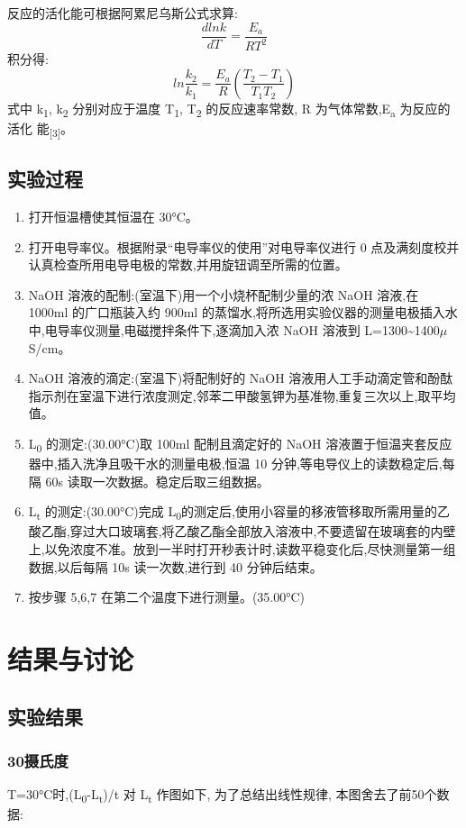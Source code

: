 \documentclass[11pt]{article}
\begin{document}
反应的活化能可根据阿累尼乌斯公式求算:
\[
\frac{dlnk}{dT}=\frac{E_{a}}{RT^{2}}
\]
积分得:
\[
ln\frac{k_{2}}{k_{1}}=\frac{E_{a}}{R}(\frac{T_{2}-T_{1}}{T_{1}T_{2}})
\]
式中 k\textsubscript{1}, k\textsubscript{2} 分别对应于温度 T\textsubscript{1}, T\textsubscript{2} 的反应速率常数,
R 为气体常数,E\textsubscript{a} 为反应的活化
能\textsubscript{[3]}。
\subsection{实验过程}
\label{sec:orgc883c78}

\begin{enumerate}
\item 打开恒温槽使其恒温在 30°C。
\item 打开电导率仪。根据附录“电导率仪的使用”对电导率仪进行 0 点及满刻度校并认真检查所用电导电极的常数,并用旋钮调至所需的位置。
\item NaOH 溶液的配制:(室温下)用一个小烧杯配制少量的浓 NaOH 溶液,在 1000ml 的广口瓶装入约 900ml 的蒸馏水,将所选用实验仪器的测量电极插入水中,电导率仪测量,电磁搅拌条件下,逐滴加入浓 NaOH 溶液到 L=1300\textasciitilde{}1400\(\mu\) S/cm。
\item NaOH 溶液的滴定:(室温下)将配制好的 NaOH 溶液用人工手动滴定管和酚酞指示剂在室温下进行浓度测定,邻苯二甲酸氢钾为基准物,重复三次以上,取平均值。
\item L\textsubscript{0} 的测定:(30.00°C)取 100ml 配制且滴定好的 NaOH 溶液置于恒温夹套反应器中,插入洗净且吸干水的测量电极,恒温 10 分钟,等电导仪上的读数稳定后,每隔 60s 读取一次数据。稳定后取三组数据。
\item L\textsubscript{t} 的测定:(30.00°C)完成 L\textsubscript{0}的测定后,使用小容量的移液管移取所需用量的乙酸乙酯,穿过大口玻璃套,将乙酸乙酯全部放入溶液中,不要遗留在玻璃套的内壁上,以免浓度不准。放到一半时打开秒表计时,读数平稳变化后,尽快测量第一组数据,以后每隔 10s 读一次数,进行到 40 分钟后结束。
\item 按步骤 5,6,7 在第二个温度下进行测量。(35.00°C)
\end{enumerate}
\section{结果与讨论}
\label{sec:orgd299abc}
\subsection{实验结果}
\label{sec:orge08940f}
\subsubsection{30摄氏度}
\label{sec:org6925ea6}
T=30°C时,(L\textsubscript{0}-L\textsubscript{t})/t 对 L\textsubscript{t} 作图如下, 为了总结出线性规律, 本图舍去了前50个数据:
\end{document}
